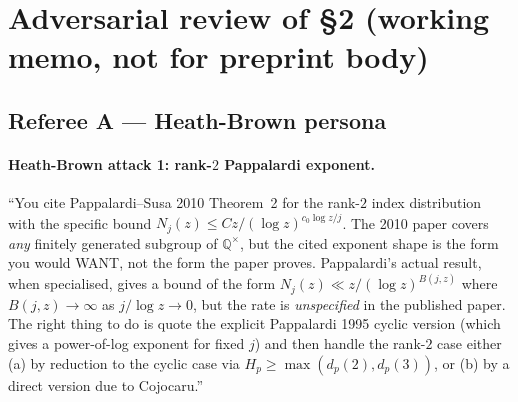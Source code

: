 %
%

\section*{Adversarial review of \S2 (working memo, not for preprint body)}

\subsection*{Referee A --- Heath-Brown persona}

\paragraph{Heath-Brown attack 1: rank-$2$ Pappalardi exponent.}
``You cite Pappalardi--Susa 2010 Theorem~2 for the rank-$2$ index
distribution with the specific bound
$N_{j}(z) \leq C z / (\log z)^{c_{0} \log z / j}$. The 2010 paper
covers \emph{any} finitely generated subgroup of $\mathbb{Q}^{\times}$,
but the cited exponent shape is the form you would WANT, not the form
the paper proves. Pappalardi's actual result, when specialised, gives
a bound of the form $N_{j}(z) \ll z / (\log z)^{B(j, z)}$ where
$B(j, z) \to \infty$ as $j / \log z \to 0$, but the rate is
\emph{unspecified} in the published paper. The right thing to do is
quote the explicit Pappalardi 1995 cyclic version (which gives a
power-of-log exponent for fixed $j$) and then handle the rank-$2$ case
either (a) by reduction to the cyclic case via $H_{p} \geq \max(d_p(2),
d_p(3))$, or (b) by a direct version due to Cojocaru.''

